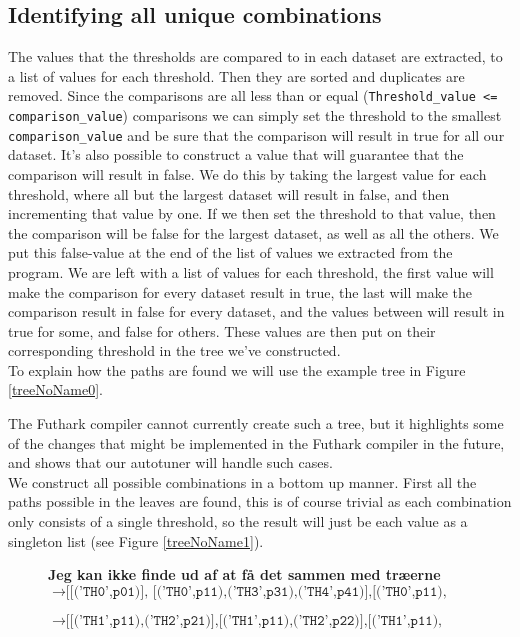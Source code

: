 \subsection{Identifying all unique combinations}
The values that the thresholds are compared to in each dataset are extracted,
to a list of values for each threshold. Then they are sorted and duplicates are
removed. Since the comparisons are all less than or equal
(\texttt{Threshold\_value <= comparison\_value}) comparisons we can simply
set the threshold to the smallest \texttt{comparison\_value} and be sure that the comparison
will result in true for all our dataset. It's also possible to construct a
value that will guarantee that the comparison will result in false. We do this
by taking the largest value for each threshold, where all but the largest
dataset will result in false, and then incrementing that value by one. If we then set the threshold to that value, then the comparison will be false for the largest dataset, as well as all the others. We put this false-value at
the end of the list of values we extracted from the program. We are left with a
list of values for each threshold, the first value will make the comparison for
every dataset result in true, the last will make the comparison result in false
for every dataset, and the values between will result in true for some, and
false for others. These values are then put on their corresponding threshold in
the tree we've constructed.
\\
To explain how the paths are found we will use the example tree in Figure \ref{treeNoName0}.

The Futhark compiler cannot currently create such a tree, but
it highlights some of the changes that  might be implemented in the Futhark
compiler in the future, and shows that our autotuner will handle such cases. \\
We construct all possible combinations in a bottom up manner. First
all the paths possible in the leaves are found, this is of course trivial as
each combination only consists of a single threshold, so the result will just
be each value as a singleton list (see Figure \ref{treeNoName1}).

\begin{figure}[]
  \centering
  \textbf{Jeg kan ikke finde ud af at få det sammen med træerne}
$\to \texttt{[[('TH0',p01)],
[('TH0',p11),('TH3',p31),('TH4',p41)],[('TH0',p11),('TH3',p31),('TH4',p42)],[('TH0',p11),('TH3',p32),('TH4',p41)],[('TH0',p11),('TH3',p32),('TH4',p42)]
[('TH0',p12),('TH3',p31),('TH4',p41)],[('TH0',p12),('TH3',p31),('TH4',p42)],[('TH0',p12),('TH3',p32),('TH4',p41)],[('TH0',p12),('TH3',p32),('TH4',p42)]
]}$

$\to \texttt{[[('TH1',p11),('TH2',p21)],[('TH1',p11),('TH2',p22)],[('TH1',p11),('TH2',p23)]
             [[('TH1',p12),('TH2',p21)],[('TH1',p12),('TH2',p22)],[('TH1',p12),('TH2',p23)]
             [[('TH1',p12),('TH5',p51)],[('TH1',p12),('TH5',p52)]
             [[('TH1',p13),('TH5',p51)],[('TH1',p13),('TH5',p52)]]}$
\end{figure}
